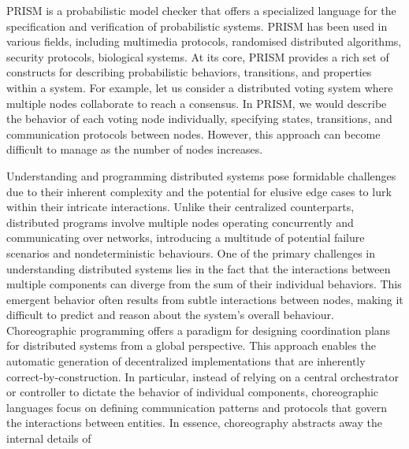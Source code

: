 PRISM \cite{PRISMdoc} is a probabilistic model checker that offers a
specialized language for the specification and verification of
probabilistic systems. PRISM has been used in various fields, including multimedia protocols, randomised
distributed algorithms, security protocols, biological systems.  At
its core, PRISM provides a rich set of constructs for describing
probabilistic behaviors, transitions, and properties within a system.
For example, let us consider a distributed voting system where
multiple nodes collaborate to reach a consensus. In PRISM, we would
describe the behavior of each voting node individually, specifying
states, transitions, and communication protocols between
nodes. However, this approach can become difficult to manage as the
number of nodes increases.

Understanding and programming distributed systems pose formidable
challenges due to their inherent complexity and the potential for
elusive edge cases to lurk within their intricate interactions. Unlike
their centralized counterparts, distributed programs involve multiple
nodes operating concurrently and communicating over networks,
introducing a multitude of potential failure scenarios and
nondeterministic behaviours.
%
One of the primary challenges in understanding distributed systems
lies in the fact that the interactions between multiple components can
diverge from the sum of their individual behaviors. This emergent
behavior often results from subtle interactions between nodes, making
it difficult to predict and reason about the system's overall
behaviour.
%
Choreographic programming offers a paradigm for designing coordination
plans for distributed systems from a global perspective. This approach
enables the automatic generation of decentralized implementations that
are inherently correct-by-construction.
%
In particular, instead of relying on a central orchestrator or
controller to dictate the behavior of individual components,
choreographic languages focus on defining communication patterns and
protocols that govern the interactions between entities.
%
In essence, choreography abstracts away the internal details of
